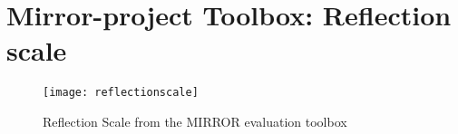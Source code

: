 \chapter{Mirror-project Toolbox: Reflection scale}
\begin{figure}[h!]
\label{reflectionscale}
\centering
	\texttt{[image: reflectionscale]}
\caption{Reflection Scale from the MIRROR evaluation toolbox}
\end{figure}
